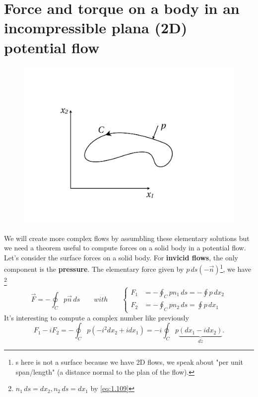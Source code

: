 \section{Force and torque on a body in an incompressible plana (2D) potential flow}
	\begin{figure}
		\vspace{-10mm}	
		\includegraphics[scale=0.18]{ch3/7}	
		\end{figure}
		We will create more complex flows by assumbling these elementary solutions but we need a theorem useful to compute forces on a solid body in a potential flow. Let's consider the surface forces on a solid body. For \textbf{invicid flows}, the only component is the \textbf{pressure}. The elementary force given by $p\, ds (-\vec{n})$\footnote{s here is not a surface because we have 2D flows, we speak about "per unit span/length" (a distance normal to the plan of the flow).}, we have \footnote{$n_1\, ds = dx_2, n_2 \, ds = dx_1$ by \eqref{eq:1.109}}
	\begin{equation}
		\vec{F} = -\oint _C p\vec{n}\,ds \qquad with \qquad
		\left\{
		\begin{aligned}
		F_1 &= -\oint _C pn_1\,ds = - \oint p \, dx_2\\
		F_2 &= -\oint _C pn_2\,ds =  \oint p \, dx_1
		\end{aligned}
		\right.
	\end{equation}
	It's interesting to compute a complex number like previously 
	\begin{equation}
		F_1 - i F_2 = - \oint_C p (-i^2 dx_2 + i dx_1) = - i \oint_C p \underbrace{(dx_1 - i dx_2)}_{d\bar{z}}. 
	\end{equation}
	
